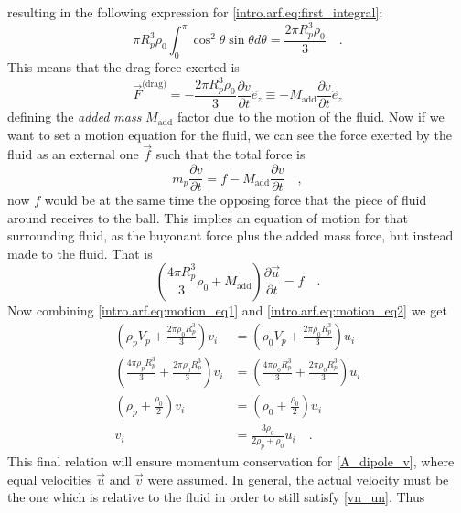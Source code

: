 resulting in the following expression for \eqref{intro.arf.eq:first_integral}:
\begin{equation}
    \pi R_p^3\rho_0\int_{0}^{\pi}\cos^2\theta\sin\theta d\theta = \frac{2\pi R_p^3\rho_0}{3}\quad.
\end{equation}
This means that the drag force exerted is
\begin{equation}
    \vec F^{\text{(drag)}} = -\frac{2\pi R_p^3\rho_0}{3}\frac{\partial v}{\partial t}\hat e_{z} \equiv -M_{\text{add}}\frac{\partial v}{\partial t}\hat e_{z}
\end{equation}
defining the \textit{added mass} $M_{\text{add}}$ factor due to the motion of the fluid. Now if we want to set a motion equation for the fluid, we can see the force exerted by the fluid as an external one $\vec f$ such that the total force is
\begin{equation}\label{intro.arf.eq:motion_eq1}
    m_p\frac{\partial v}{\partial t} = f - M_{\text{add}}\frac{\partial v}{\partial t}\quad,
\end{equation}
now $f$ would be at the same time the opposing force that the piece of fluid around receives to the ball. This implies an equation of motion for that surrounding fluid, as the buyonant force plus the added mass force, but instead made to the fluid. That is
\begin{equation}\label{intro.arf.eq:motion_eq2}
    (\frac{4\pi R_p^3}{3}\rho_0 + M_{\text{add}})\frac{\partial\vec u}{\partial t} = f\quad.
\end{equation}
Now combining \eqref{intro.arf.eq:motion_eq1} and \eqref{intro.arf.eq:motion_eq2} we get
\begin{align}
    \left(\rho_pV_p + \frac{2\pi\rho_0R_p^3}{3}\right)v_i &=\left(\rho_0V_p + \frac{2\pi\rho_0R_p^3}{3}\right)u_i\nonumber\\
    \left(\frac{4\pi\rho_pR_p^3}{3} + \frac{2\pi\rho_0R_p^3}{3}\right)v_i &=\left(\frac{4\pi\rho_0R_p^3}{3} + \frac{2\pi\rho_0R_p^3}{3}\right)u_i\nonumber\\
    \left(\rho_p + \frac{\rho_0}{2}\right)v_i &=\left(\rho_0 + \frac{\rho_0}{2}\right)u_i\nonumber\\
    v_i &=\frac{3\rho_0}{2\rho_p + \rho_0}u_i\quad.\label{intro.arf.eq:u_v_relation}
\end{align}
This final relation will ensure momentum conservation for \eqref{A_dipole_v}, where equal velocities $\vec u$ and $\vec v$ were assumed. In general, the actual velocity must be the one which is relative to the fluid in order to still satisfy \eqref{vn_un}. Thus
